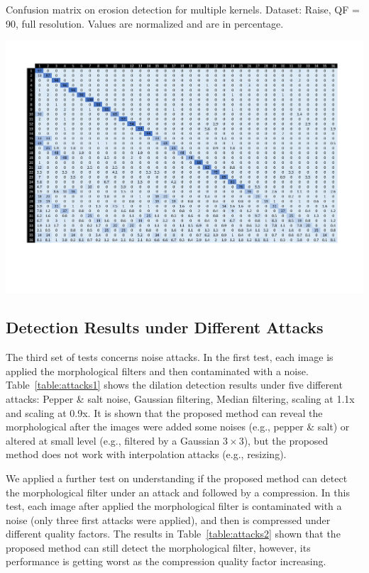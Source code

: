 \documentclass[review]{elsarticle}
\begin{document}
\begin{table}
	\centering
	\caption{Confusion matrix on erosion detection for multiple kernels. Dataset: Raise, QF = 90, full resolution. Values are normalized and are in percentage.}
	\label{table:confusion}
	\includegraphics[width=\linewidth]{confusion}
\end{table}

\subsection{Detection Results under Different Attacks}
\label{subsec:result_attacks}

The third set of tests concerns noise attacks. In the first test, each image is applied the morphological filters and then contaminated with a noise. Table~\ref{table:attacks1} shows the dilation detection results under five different attacks: Pepper \& salt noise, Gaussian filtering, Median filtering, scaling at 1.1x and scaling at 0.9x. It is shown that the proposed method can reveal the morphological after the images were added some noises (e.g., pepper \& salt) or altered at small level (e.g., filtered by a Gaussian $3 \times 3$), but the proposed method does not work with interpolation attacks (e.g., resizing). 

We applied a further test on understanding if the proposed method can detect the morphological filter under an attack and followed by a compression. In this test, each image after applied the morphological filter is contaminated with a noise (only three first attacks were applied), and then is compressed under different quality factors.  The results in Table~\ref{table:attacks2} shown that the proposed method can still detect the morphological filter, however, its performance is getting worst as the compression quality factor increasing.  
\end{document}
